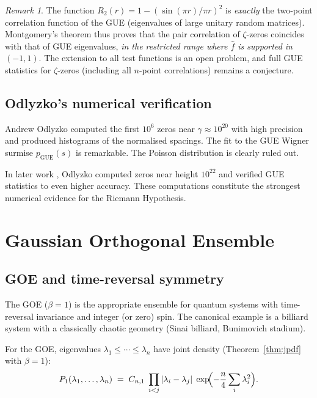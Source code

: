 \documentclass[12pt,a4paper]{amsart}
\theoremstyle{definition}
\theoremstyle{remark}
\newtheorem{remark}[theorem]{Remark}
\begin{document}
\begin{remark}
The function $R_2(r) = 1 - (\sin(\pi r)/\pi r)^2$ is \emph{exactly} the
two-point correlation function of the GUE (eigenvalues of large unitary random
matrices). Montgomery's theorem thus proves that the pair correlation of
$\zeta$-zeros coincides with that of GUE eigenvalues,
\emph{in the restricted range where $\hat{f}$ is supported in $(-1,1)$}.
The extension to all test functions is an open problem, and full GUE statistics
for $\zeta$-zeros (including all $n$-point correlations) remains a conjecture.
\end{remark}

\subsection{Odlyzko's numerical verification}

Andrew Odlyzko \cite{Odlyzko1987} computed the first $10^6$ zeros near
$\gamma \approx 10^{20}$ with high precision and produced histograms of the
normalised spacings. The fit to the GUE Wigner surmise $p_{\mathrm{GUE}}(s)$
is remarkable. The Poisson distribution is clearly ruled out.

In later work \cite{Odlyzko2001}, Odlyzko computed zeros near height $10^{22}$ and
verified GUE statistics to even higher accuracy. These computations constitute
the strongest numerical evidence for the Riemann Hypothesis.

\section{Gaussian Orthogonal Ensemble}
\label{sec:goe}

\subsection{GOE and time-reversal symmetry}

The GOE ($\beta = 1$) is the appropriate ensemble for quantum systems with
time-reversal invariance and integer (or zero) spin. The canonical example is
a billiard system with a classically chaotic geometry (Sinai billiard,
Bunimovich stadium).

For the GOE, eigenvalues $\lambda_1 \leq \cdots \leq \lambda_n$ have joint
density (Theorem~\ref{thm:jpdf} with $\beta = 1$):
\[
  P_1(\lambda_1,\ldots,\lambda_n)
  \;=\; C_{n,1}\;\prod_{i<j}|\lambda_i - \lambda_j|\;\exp\!\Bigl(-\frac{n}{4}\sum_i \lambda_i^2\Bigr).
\]
\end{document}
